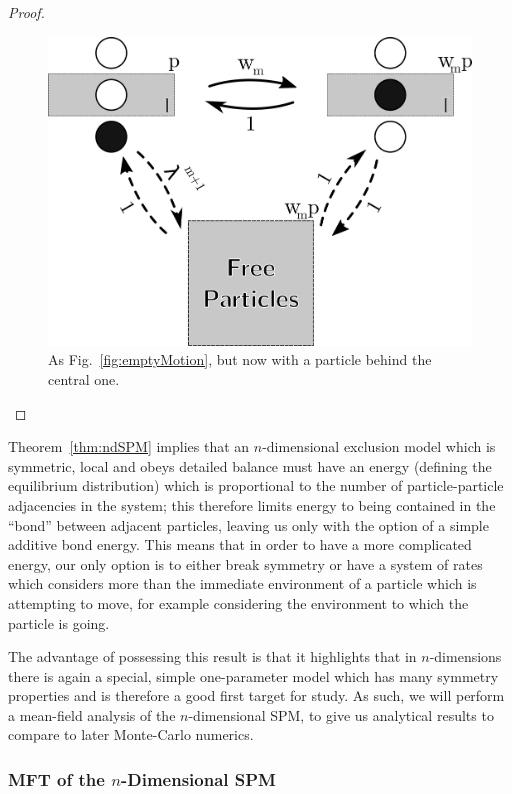 \begin{proof}
 \begin{figure}[h!]
 \caption[Figure demonstrating that particle motion out of a hyperplane with $m$ adjacent particles away from an empty space moves with rate $\lambda^m$.]{\label{fig:fullMotion} 
 As Fig.~\ref{fig:emptyMotion}, but now with a particle behind the central one. 
 }
  \begin{center}
 \includegraphics[width=0.66\linewidth]{analytics/images/ndDBwCycle}
  \end{center}
\end{figure}

\end{proof}

Theorem~\ref{thm:ndSPM} implies that an $n$-dimensional exclusion model which is symmetric, local and obeys detailed balance must have an energy (defining the equilibrium distribution)
which is proportional to the number of particle-particle adjacencies in the system; this
therefore limits energy to being contained in the ``bond'' between adjacent particles, leaving us only with the option of a simple additive bond energy. This means that in order to have a more complicated energy, our only option is to either break symmetry or have a
system of rates which considers more than the immediate environment of a particle which is
attempting to move, for example considering the environment to which the particle is going.

The advantage of possessing this result is that it highlights that in $n$-dimensions
there is again a special, simple one-parameter model which has many symmetry properties and
is therefore a good first target for study. As such, we will perform a mean-field analysis
of the $n$-dimensional SPM, to give us analytical results to compare to later Monte-Carlo numerics.

\subsubsection{MFT of the $n$-Dimensional SPM}

